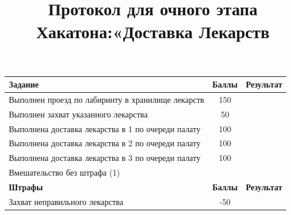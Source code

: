 \documentclass[12pt]{article}
\date{} %
\title{Протокол для очного этапа \\ Хакатона:«Доставка Лекарств}
\newcommand{\penaltyOne}{\color{red}-50}
\newcommand{\namePenaltyOne}{Захват неправильного лекарства}
\newcommand{\taskOne}{150}
\newcommand{\nameTaskOne}{Выполнен проезд по лабиринту в хранилище лекарств}
\newcommand{\taskSecond}{50}
\newcommand{\nameTaskSecond}{Выполнен захват указанного лекарства}
\newcommand{\taskThird}{100}
\newcommand{\nameTaskThird}{Выполнена доставка лекарства в 1 по очереди палату}
\newcommand{\taskFourth}{100}
\newcommand{\nameTaskFourth}{Выполнена доставка лекарства в 2 по очереди палату}
\newcommand{\taskFifth}{100}
\newcommand{\nameTaskFifth}{Выполнена доставка лекарства в 3 по очереди палату}
\begin{document}
\maketitle
\thispagestyle{empty}
\vspace*{-2cm}


\renewcommand{\arraystretch}{1}
\vspace*{0.25cm}
\begin{tabularx}{\textwidth}{|X|c|p{2cm}|}
    \hline
    \textbf{Задание} & \textbf{Баллы} & \textbf{Результат}\\
    \hline
    \nameTaskOne & \taskOne &  \\
    \hline
    \nameTaskSecond & \taskSecond & \\
    \hline
    \nameTaskThird & \taskThird & \\
    \hline 
    \nameTaskFourth & \taskFourth & \\
    \hline
    \nameTaskFifth & \taskFifth & \\
    \hline
    Вмешательство без штрафа (1) &  \\
    \hline
    \textbf{Штрафы} & \textbf{Баллы} & \textbf{Результат} \\
    \hline
    \namePenaltyOne & \penaltyOne &  \\
    \hline
\end{tabularx}
\vspace*{0.25cm}
\end{document}
